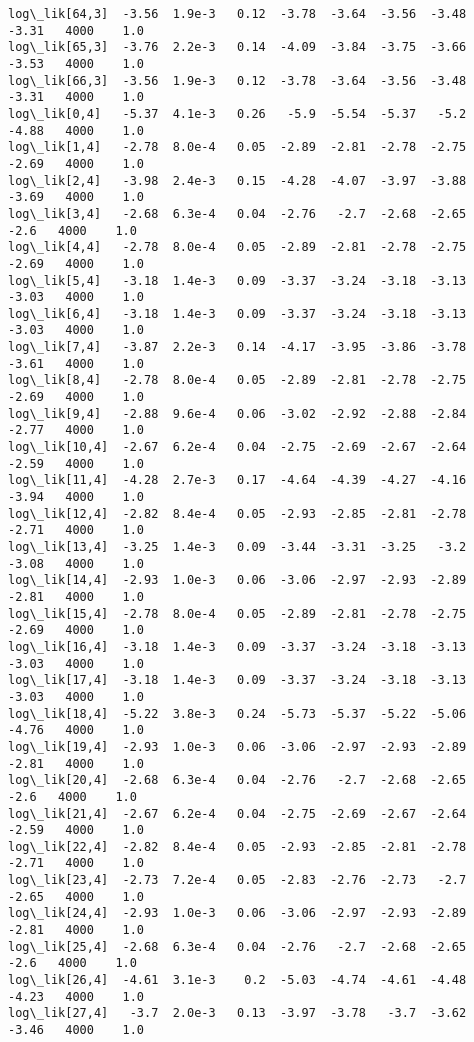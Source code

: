 \documentclass[11pt]{article}
\begin{document}
\begin{Verbatim}[commandchars=\\\{\}]
log\_lik[64,3]  -3.56  1.9e-3   0.12  -3.78  -3.64  -3.56  -3.48  -3.31   4000    1.0
log\_lik[65,3]  -3.76  2.2e-3   0.14  -4.09  -3.84  -3.75  -3.66  -3.53   4000    1.0
log\_lik[66,3]  -3.56  1.9e-3   0.12  -3.78  -3.64  -3.56  -3.48  -3.31   4000    1.0
log\_lik[0,4]   -5.37  4.1e-3   0.26   -5.9  -5.54  -5.37   -5.2  -4.88   4000    1.0
log\_lik[1,4]   -2.78  8.0e-4   0.05  -2.89  -2.81  -2.78  -2.75  -2.69   4000    1.0
log\_lik[2,4]   -3.98  2.4e-3   0.15  -4.28  -4.07  -3.97  -3.88  -3.69   4000    1.0
log\_lik[3,4]   -2.68  6.3e-4   0.04  -2.76   -2.7  -2.68  -2.65   -2.6   4000    1.0
log\_lik[4,4]   -2.78  8.0e-4   0.05  -2.89  -2.81  -2.78  -2.75  -2.69   4000    1.0
log\_lik[5,4]   -3.18  1.4e-3   0.09  -3.37  -3.24  -3.18  -3.13  -3.03   4000    1.0
log\_lik[6,4]   -3.18  1.4e-3   0.09  -3.37  -3.24  -3.18  -3.13  -3.03   4000    1.0
log\_lik[7,4]   -3.87  2.2e-3   0.14  -4.17  -3.95  -3.86  -3.78  -3.61   4000    1.0
log\_lik[8,4]   -2.78  8.0e-4   0.05  -2.89  -2.81  -2.78  -2.75  -2.69   4000    1.0
log\_lik[9,4]   -2.88  9.6e-4   0.06  -3.02  -2.92  -2.88  -2.84  -2.77   4000    1.0
log\_lik[10,4]  -2.67  6.2e-4   0.04  -2.75  -2.69  -2.67  -2.64  -2.59   4000    1.0
log\_lik[11,4]  -4.28  2.7e-3   0.17  -4.64  -4.39  -4.27  -4.16  -3.94   4000    1.0
log\_lik[12,4]  -2.82  8.4e-4   0.05  -2.93  -2.85  -2.81  -2.78  -2.71   4000    1.0
log\_lik[13,4]  -3.25  1.4e-3   0.09  -3.44  -3.31  -3.25   -3.2  -3.08   4000    1.0
log\_lik[14,4]  -2.93  1.0e-3   0.06  -3.06  -2.97  -2.93  -2.89  -2.81   4000    1.0
log\_lik[15,4]  -2.78  8.0e-4   0.05  -2.89  -2.81  -2.78  -2.75  -2.69   4000    1.0
log\_lik[16,4]  -3.18  1.4e-3   0.09  -3.37  -3.24  -3.18  -3.13  -3.03   4000    1.0
log\_lik[17,4]  -3.18  1.4e-3   0.09  -3.37  -3.24  -3.18  -3.13  -3.03   4000    1.0
log\_lik[18,4]  -5.22  3.8e-3   0.24  -5.73  -5.37  -5.22  -5.06  -4.76   4000    1.0
log\_lik[19,4]  -2.93  1.0e-3   0.06  -3.06  -2.97  -2.93  -2.89  -2.81   4000    1.0
log\_lik[20,4]  -2.68  6.3e-4   0.04  -2.76   -2.7  -2.68  -2.65   -2.6   4000    1.0
log\_lik[21,4]  -2.67  6.2e-4   0.04  -2.75  -2.69  -2.67  -2.64  -2.59   4000    1.0
log\_lik[22,4]  -2.82  8.4e-4   0.05  -2.93  -2.85  -2.81  -2.78  -2.71   4000    1.0
log\_lik[23,4]  -2.73  7.2e-4   0.05  -2.83  -2.76  -2.73   -2.7  -2.65   4000    1.0
log\_lik[24,4]  -2.93  1.0e-3   0.06  -3.06  -2.97  -2.93  -2.89  -2.81   4000    1.0
log\_lik[25,4]  -2.68  6.3e-4   0.04  -2.76   -2.7  -2.68  -2.65   -2.6   4000    1.0
log\_lik[26,4]  -4.61  3.1e-3    0.2  -5.03  -4.74  -4.61  -4.48  -4.23   4000    1.0
log\_lik[27,4]   -3.7  2.0e-3   0.13  -3.97  -3.78   -3.7  -3.62  -3.46   4000    1.0

\end{Verbatim}
\end{document}
